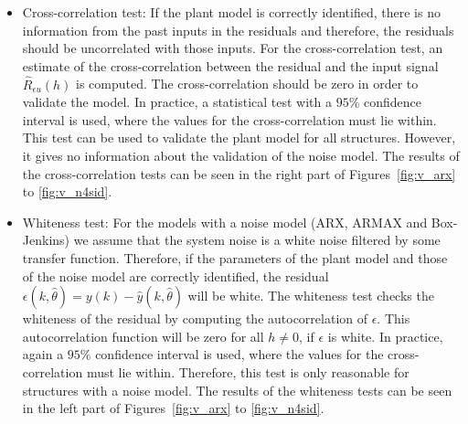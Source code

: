 \begin{itemize}
	\item Cross-correlation test: If the plant model is correctly identified, there is no information from the past inputs in the residuals and therefore, the residuals should be uncorrelated with those inputs. 
	For the cross-correlation test, an estimate of the cross-correlation between the residual and the input signal $\hat{R}_{\epsilon u}(h)$ is computed. The cross-correlation should be zero in order to validate the model. In practice, a statistical test with a $95\%$ confidence interval is used, where the values for the cross-correlation must lie within. This test can be used to validate the plant model for all structures. However, it gives no information about the validation of the noise model. 
	The results of the cross-correlation tests can be seen in the right part of Figures~\ref{fig:v_arx} to \ref{fig:v_n4sid}. 
	\item Whiteness test: For the models with a noise model (ARX, ARMAX and Box-Jenkins) we assume that the system noise is a white noise filtered by some transfer function. Therefore, if the parameters of the plant model and those of the noise model are correctly identified, the residual $\epsilon (k, \hat{\theta}) = y(k) - \hat{y}(k, \hat{\theta})$ will be white.
	The whiteness test checks the whiteness of the residual by computing the autocorrelation of $\epsilon$. This autocorrelation function will be zero for all $h \neq 0$, if $\epsilon$ is white. In practice, again a $95\%$ confidence interval is used, where the values for the cross-correlation must lie within.
	Therefore, this test is only reasonable for structures with a noise model.
	The results of the whiteness tests can be seen in the left part of Figures~\ref{fig:v_arx} to \ref{fig:v_n4sid}. 
\end{itemize}

